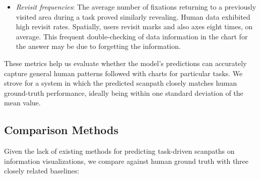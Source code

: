 {\begin{itemize}
    \item \textit{Revisit frequencies}: The average number of fixations returning to a previously visited area during a task proved similarly revealing. Human data exhibited high revisit rates. Spatially, users revisit marks and also axes eight times, on average. This frequent double-checking of data information in the chart for the answer may be due to forgetting the information.
\end{itemize}
These metrics help us evaluate whether the model's predictions can accurately capture general human patterns followed with charts for particular tasks. We strove for a system in which the predicted scanpath closely matches human ground-truth performance, ideally being within one standard deviation of the mean value.
}

\subsection{Comparison Methods}

Given the lack of existing methods for predicting task-driven scanpaths on information visualizations, we compare \name against human ground truth with three closely related baselines:

